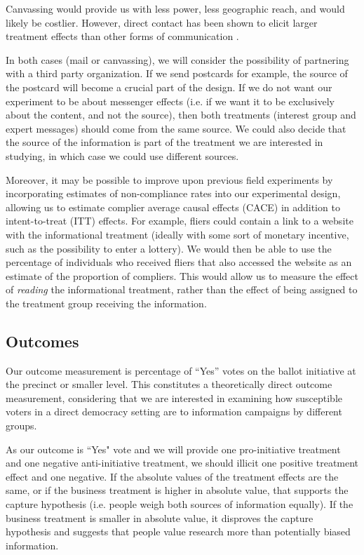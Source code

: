 \documentclass[12pt,final,fleqn]{article}
\theoremstyle{plain}
\begin{document}
Canvassing would provide us with less power, less geographic reach, and would likely be costlier. However, direct contact has been shown to elicit larger treatment effects than other forms of communication \citep{kalla2018minimal}.

In both cases (mail or canvassing), we will consider the possibility of partnering with a third party organization. If we send postcards for example, the source of the postcard will become a crucial part of the design. If we do not want our experiment to be about messenger effects (i.e. if we want it to be exclusively about the content, and not the source), then both treatments (interest group and expert messages) should come from the same source. We could also decide that the source of the information is part of the treatment we are interested in studying, in which case we could use different sources. 

Moreover, it may be possible to improve upon previous field experiments by incorporating estimates of non-compliance rates into our experimental design, allowing us to estimate complier average causal effects (CACE) in addition to intent-to-treat (ITT) effects. For example, fliers could contain a link to a website with the informational treatment (ideally with some sort of monetary incentive, such as the possibility to enter a lottery). We would then be able to use the percentage of individuals who received fliers that also accessed the website as an estimate of the proportion of compliers. This would allow us to measure the effect of \textit{reading} the informational treatment, rather than the effect of being assigned to the treatment group receiving the information.

\subsection{Outcomes} \label{sec: Outcomes}

Our outcome measurement is percentage of ``Yes'' votes on the ballot initiative at the precinct or smaller level. This constitutes a theoretically direct outcome measurement, considering that we are interested in examining how susceptible voters in a direct democracy setting are to information campaigns by different groups. 

As our outcome is ``Yes" vote and we will provide one pro-initiative treatment and one negative anti-initiative treatment, we should illicit one positive treatment effect and one negative. If the absolute values of the treatment effects are the same, or if the business treatment is higher in absolute value, that supports the capture hypothesis (i.e. people weigh both sources of information equally). If the business treatment is smaller in absolute value, it disproves the capture hypothesis and suggests that people value research more than potentially biased information.
\end{document}
